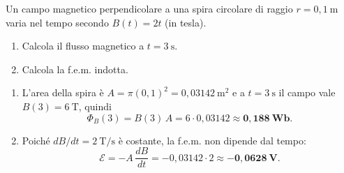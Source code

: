 \begin{question}[ID=1.7, subtitle={Spira circolare in campo variabile generato da filo — flusso e f.e.m.}, tags={induzione magnetica, flusso, Faraday}, difficulty=media]
Un campo magnetico perpendicolare a una spira circolare di raggio $r = 0{,}1\ \text{m}$ varia nel tempo secondo $B(t) = 2t$ (in tesla).
\begin{enumerate}
    \item Calcola il flusso magnetico a $t = 3\ \text{s}$.
    \item Calcola la f.e.m. indotta.
\end{enumerate}
\begin{solution}
    \begin{enumerate}
        \item L'area della spira è $A = \pi(0{,}1)^2 = 0{,}03142\ \text{m}^2$ e a $t = 3\ \text{s}$ il campo vale $B(3) = 6\ \text{T}$, quindi
        \[
        \Phi_B(3) = B(3)\,A = 6\cdot 0{,}03142 \approx \mathbf{0{,}188\ \text{Wb}}.
        \]
        \item Poiché $dB/dt = 2\ \text{T/s}$ è costante, la f.e.m. non dipende dal tempo:
        \[
        \mathcal{E} = -A\,\frac{dB}{dt} = -0{,}03142\cdot 2 \approx \mathbf{-0{,}0628\ \text{V}}.
        \]
    \end{enumerate}
\end{solution}
\end{question}


